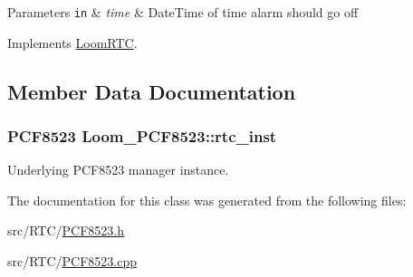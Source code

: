 \begin{DoxyParams}[1]{Parameters}
\mbox{\tt in}  & {\em time} & Date\+Time of time alarm should go off \\
\hline
\end{DoxyParams}


Implements \hyperlink{class_loom_r_t_c_a34b7dd8dacbfdb61876cc4aabb79e67e}{Loom\+R\+TC}.



\subsection{Member Data Documentation}
\subsubsection[{\texorpdfstring{rtc\+\_\+inst}{rtc_inst}}]{\setlength{\rightskip}{0pt plus 5cm}P\+C\+F8523 Loom\+\_\+\+P\+C\+F8523\+::rtc\+\_\+inst\hspace{0.3cm}{\ttfamily [protected]}}\hypertarget{class_loom___p_c_f8523_a1eb8eaffae7033c6c2e376775e44e383}{}\label{class_loom___p_c_f8523_a1eb8eaffae7033c6c2e376775e44e383}


Underlying P\+C\+F8523 manager instance. 



The documentation for this class was generated from the following files\+:\begin{DoxyCompactItemize}
\item 
src/\+R\+T\+C/\hyperlink{_p_c_f8523_8h}{P\+C\+F8523.\+h}\item 
src/\+R\+T\+C/\hyperlink{_p_c_f8523_8cpp}{P\+C\+F8523.\+cpp}\end{DoxyCompactItemize}
